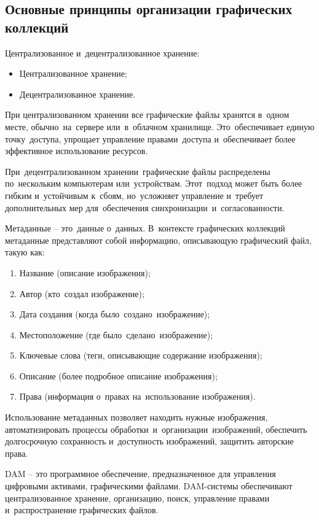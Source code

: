 \documentclass{ou}
\begin{document}
\subsection{Основные принципы организации графических коллекций}
Централизованное и~децентрализованное хранение:
\begin{itemize}[label=-, itemindent=2em, nosep]
\item Централизованное хранение;
\item Децентрализованное хранение.
\end{itemize}

 При централизованном хранении все графические файлы хранятся в~одном месте, обычно~на~сервере или~в~облачном хранилище. Это~обеспечивает единую точку~доступа, упрощает управление правами~доступа и~обеспечивает более эффективное использование ресурсов.

При~децентрализованном хранении~графические файлы распределены по~нескольким компьютерам или~устройствам. Этот~подход может быть более гибким и~устойчивым к~сбоям, но~усложняет управление и~требует дополнительных мер для~обеспечения синхронизации~и~согласованности.

Метаданные -- это~данные о~данных. В~контексте графических коллекций метаданные представляют собой информацию, описывающую графический файл, такую как:
\begin{enumerate}[itemindent=2em, nosep, label=\arabic*)]
\item Название (описание изображения);
\item Автор (кто~создал изображение);
\item Дата создания (когда было~создано~изображение);
\item Местоположение (где было~сделано~изображение);
\item Ключевые слова (теги, описывающие содержание изображения);
\item Описание (более подробное описание изображения);
\item Права (информация о~правах на~использование изображения).
\end{enumerate}

Использование метаданных позволяет находить нужные изображения, автоматизировать процессы обработки~и~организации~изображений, обеспечить долгосрочную сохранность и~доступность изображений, защитить авторские права.

DAM -- это программное обеспечение, предназначенное для управления цифровыми активами, графическими файлами. DAM-системы обеспечивают централизованное хранение, организацию, поиск, управление правами и~распространение графических файлов.
\end{document}
